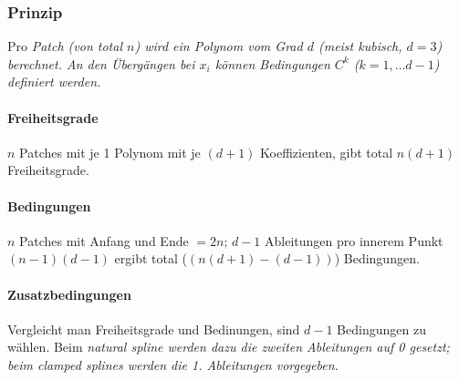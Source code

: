 \subsubsection{Prinzip}
Pro \em Patch \em (von total $n$) wird ein Polynom vom Grad $d$ (meist kubisch, $d=3$) berechnet. An den Übergängen 
bei $x_i$ können Bedingungen $C^k$ ($k=1,\ldots d-1$) definiert werden.

\paragraph{Freiheitsgrade}
$n$ Patches mit je 1 Polynom mit je $(d+1)$ Koeffizienten, gibt total $n(d+1)$ Freiheitsgrade.

\paragraph{Bedingungen}
$n$ Patches mit Anfang und Ende $=2n$;
$d-1$ Ableitungen pro innerem Punkt $(n-1)(d-1)$ ergibt total ($(n(d+1)-(d-1))$) Bedingungen.

\paragraph{Zusatzbedingungen}

Vergleicht man Freiheitsgrade und Bedinungen, sind $d-1$ Bedingungen zu wählen. Beim \em natural 
spline \em werden dazu die zweiten Ableitungen auf 0 gesetzt; beim \em clamped splines \em werden
die 1. Ableitungen vorgegeben.


